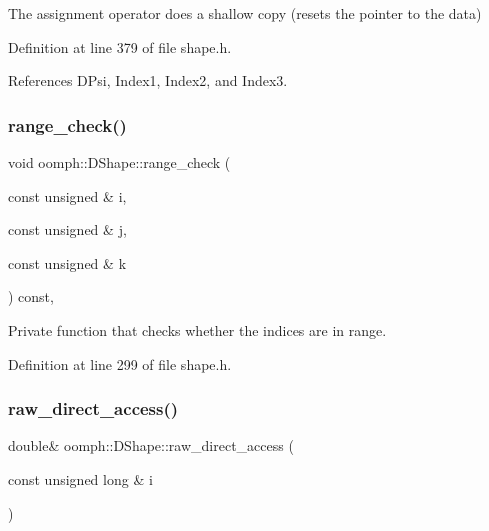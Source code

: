 The assignment operator does a shallow copy (resets the pointer to the data) 

Definition at line 379 of file shape.\+h.



References D\+Psi, Index1, Index2, and Index3.

\mbox{\label{classoomph_1_1DShape_aa6dca57c2462c28257b67500e9840b98}} 
\subsubsection{\texorpdfstring{range\+\_\+check()}{range\_check()}}
{\footnotesize\ttfamily void oomph\+::\+D\+Shape\+::range\+\_\+check (\begin{DoxyParamCaption}\item[{const unsigned \&}]{i,  }\item[{const unsigned \&}]{j,  }\item[{const unsigned \&}]{k }\end{DoxyParamCaption}) const\hspace{0.3cm}{\ttfamily [inline]}, {\ttfamily [private]}}



Private function that checks whether the indices are in range. 



Definition at line 299 of file shape.\+h.

\mbox{\label{classoomph_1_1DShape_a7974b4d85225de366759c5c96dd4e586}} 
\subsubsection{\texorpdfstring{raw\+\_\+direct\+\_\+access()}{raw\_direct\_access()}\hspace{0.1cm}{\footnotesize\ttfamily [1/2]}}
{\footnotesize\ttfamily double\& oomph\+::\+D\+Shape\+::raw\+\_\+direct\+\_\+access (\begin{DoxyParamCaption}\item[{const unsigned long \&}]{i }\end{DoxyParamCaption})\hspace{0.3cm}{\ttfamily [inline]}}



